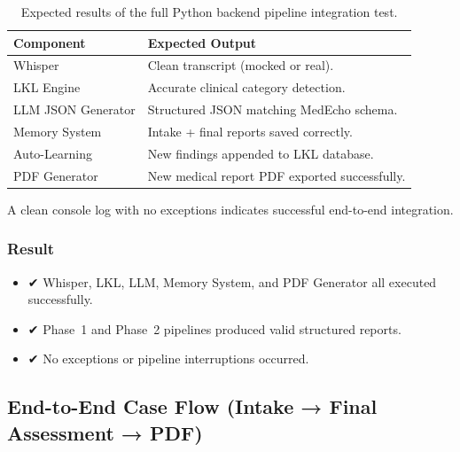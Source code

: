 \begin{table}[H]
\centering
\renewcommand{\arraystretch}{1.3}
\begin{tabular}{|p{4cm}|p{9cm}|}
\hline
\textbf{Component} & \textbf{Expected Output} \\
\hline
Whisper & Clean transcript (mocked or real). \\
\hline
LKL Engine & Accurate clinical category detection. \\
\hline
LLM JSON Generator & Structured JSON matching MedEcho schema. \\
\hline
Memory System & Intake + final reports saved correctly. \\
\hline
Auto-Learning & New findings appended to LKL database. \\
\hline
PDF Generator & New medical report PDF exported successfully. \\
\hline
\end{tabular}
\caption{Expected results of the full Python backend pipeline integration test.}
\label{tab:pipeline-expected-results}
\end{table}

A clean console log with no exceptions indicates successful end-to-end integration.






\vspace{1cm}





\subsubsection*{Result}
\begin{itemize}
    \item ✔ Whisper, LKL, LLM, Memory System, and PDF Generator all executed successfully.
    \item ✔ Phase~1 and Phase~2 pipelines produced valid structured reports.
    \item ✔ No exceptions or pipeline interruptions occurred.
\end{itemize}


\subsection{End-to-End Case Flow (Intake → Final Assessment → PDF)}
\label{sec:testing:endtoend}

